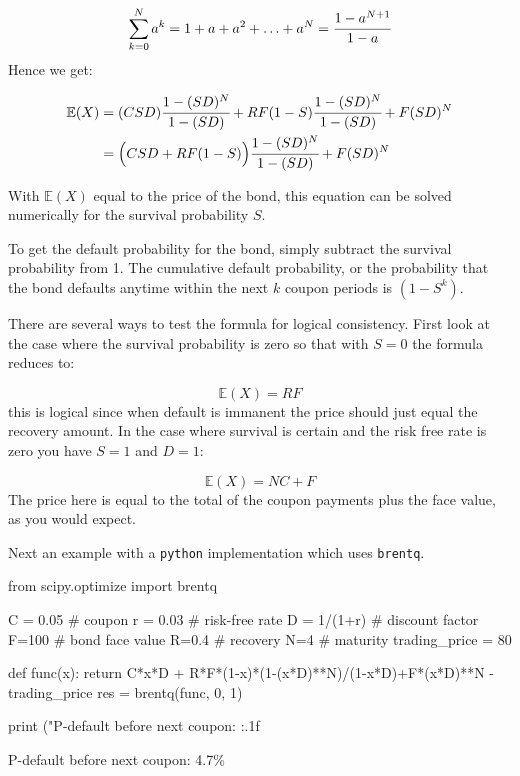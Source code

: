 \begin{attention}
\begin{equation}
\sum_{k=0}^N a^k = 1 + a + a^2 + \ldots + a^N = \cfrac{1-a^{N+1}}{1-a} 
\end{equation}
Hence we get:

\begin{align}
\begin{split}
\mathbb{E}(X) &= (CSD) \cfrac{1-(SD)^N}{1-(SD)}+RF(1-S)\cfrac{1-(SD)^N}{1-(SD)} + F(SD)^N \\
&= \Big(CSD + RF(1-S)\Big)\cfrac{1-(SD)^N}{1-(SD)} + F(SD)^N 
\end{split}
\end{align}

With $\mathbb{E}(X)$ equal to the price of the bond, this equation can be solved numerically for the survival probability $S$.

To get the default probability for the bond, simply subtract the survival probability from 1. The cumulative default probability, or the probability that the bond defaults anytime within the next $k$ coupon periods is $(1 - S^k)$.

There are several ways to test the formula for logical consistency. First look at the case where the survival probability is zero so that with $S = 0$ the formula reduces to:

\begin{equation}
\mathbb{E}(X) = RF
\end{equation}
this is logical since when default is immanent the price should just equal the recovery amount. In the case where survival is certain and the risk free rate is zero you have $S = 1$ and $D=1$:

\begin{equation}
\mathbb{E}(X) = NC + F 
\end{equation}
The price here is equal to the total of the coupon payments plus the face value, as you would expect.

Next an example with a \texttt{python} implementation which uses \texttt{brentq}.

\begin{attpython}
from scipy.optimize import brentq

C = 0.05 # coupon
r = 0.03 # risk-free rate
D = 1/(1+r) # discount factor
F=100 # bond face value
R=0.4 # recovery
N=4 # maturity
trading_price = 80

def func(x):
    return C*x*D + R*F*(1-x)*(1-(x*D)**N)/(1-x*D)+F*(x*D)**N
        -trading_price
res = brentq(func, 0, 1)

print ("P-default before next coupon: {:.1f}%
\end{attpython}
\begin{ioutput}
P-default before next coupon: 4.7\%
\end{ioutput}
\end{attention}

